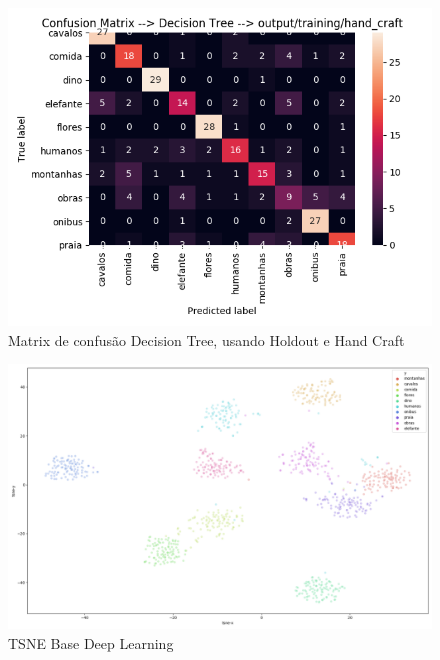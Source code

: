 \documentclass[
article,			%
11pt,				%
oneside,			%
a4paper,			%
english,			%
brazil,				%
sumario=tradicional,
]{abntex2}
\begin{document}
\begin{anexosenv}
	\begin{figure}[htb]
		\caption{\label{confusion-matrix-decision-tree-holdout-hand-craft}Matrix de confusão Decision Tree, usando Holdout e Hand Craft}
		\begin{center}
			\includegraphics[scale=0.5]{confusion-matrix-decision-tree-holdout-hand-craft.png}
		\end{center}
	\end{figure}

	\begin{figure}[htb]
		\caption{\label{tsne-deep-data}TSNE Base Deep Learning}
		\begin{center}
			\includegraphics[scale=0.3]{tsne-graph-deep.png}
		\end{center}
	\end{figure}


\end{anexosenv}
\end{document}
